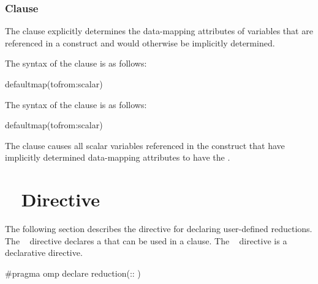 \subsubsection{ Clause}
\label{subsubsec:defaultmap clause}
\summary
The  clause explicitly determines the data-mapping attributes of variables that 
are referenced in a  construct and would otherwise be 
implicitly determined.

\syntax
\ccppspecificstart
The syntax of the  clause is as follows:

\begin{boxedcode}
defaultmap(tofrom:scalar)
\end{boxedcode}
\ccppspecificend

\fortranspecificstart
The syntax of the  clause is as follows:

\begin{boxedcode}
defaultmap(tofrom:scalar)
\end{boxedcode}
\fortranspecificend

\descr
The  clause causes all scalar variables
referenced in the construct that have implicitly determined data-mapping
attributes to have the  .








\section{~ Directive}
\label{sec:declare reduction Directive}
\summary
The following section describes the directive for declaring user-defined reductions. The 
~ directive declares a  that can be used in a 
 clause. The ~ directive is a declarative directive.

\syntax
\cspecificstart
\begin{boxedcode}
\#pragma omp declare reduction(:: 
)
\end{boxedcode}

